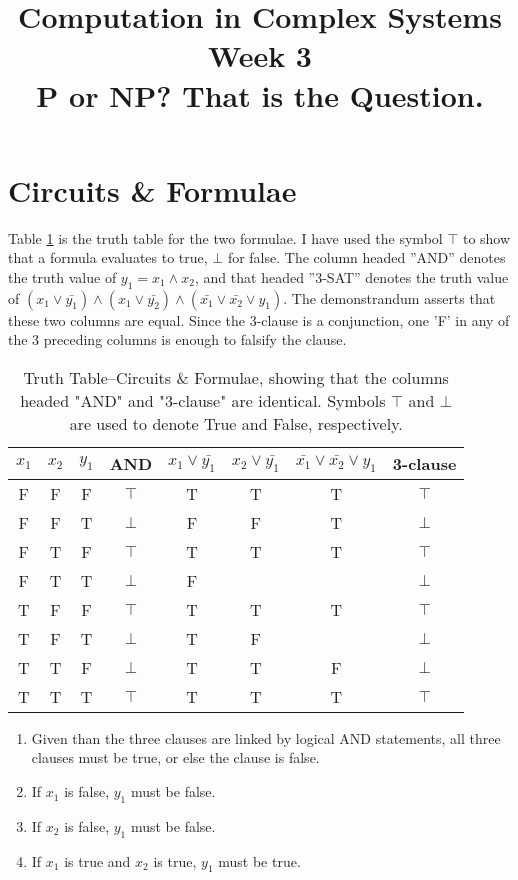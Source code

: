 \documentclass[]{article}
\title{Computation in Complex Systems\\
	Week 3\\
	P or NP? That is the Question.
	}
\begin{document}
\maketitle

\section{Circuits \& Formulae}

Table \ref{table:truth} is the truth table for the two formulae. I have used the symbol $\top$ to show that a formula evaluates to true, $\bot$ for false. The column headed ''AND'' denotes the truth value of $y_1 = x_1 \land x_2$, and that headed ''3-SAT'' denotes the truth value of $ (x_1\lor \bar{y_1}) \land (x_1\lor \bar{y_2}) \land (\bar{x_1} \lor \bar{x_2} \lor y_1)$. The demonstrandum asserts that these two columns are equal. Since the 3-clause is a conjunction, one 'F' in any of the 3 preceding columns is enough to falsify the clause.

\begin{table}[H]
	\caption{Truth Table--Circuits \& Formulae, showing that the columns headed "AND" and "3-clause" are identical. Symbols $\top$ and $\bot$ are used to denote True and False, respectively.}\label{table:truth}
	\begin{center}
		\begin{tabular}{|c|c|c||c|c|c|c||c|}\hline
			$x_1$&$x_2$&$y_1$&AND&$x_1 \lor \bar{y_1}$&$x_2 \lor \bar{y_1}$&$\bar{x_1}\lor\bar{x_2}\lor y_1$&3-clause\\ \hline
			F&F&F&$\top$&T&T&T&$\top$\\ \hline
			F&F&T&$\bot$&F&F&T&$\bot$\\ \hline
			F&T&F&$\top$&T&T&T&$\top$\\ \hline
			F&T&T&$\bot$&F&&&$\bot$\\ \hline
			T&F&F&$\top$&T&T&T&$\top$\\ \hline
			T&F&T&$\bot$&T&F&&$\bot$\\ \hline
			T&T&F&$\bot$&T&T&F&$\bot$\\ \hline
			T&T&T&$\top$&T&T&T&$\top$\\ \hline
		\end{tabular}
	\end{center}
\end{table}

\begin{enumerate}
	\item Given than the three clauses are linked by logical AND statements, all three clauses must be true, or else the clause is false.
	
	\item If $x_1$ is false, $y_1$ must be false.
	
	\item If $x_2$ is false, $y_1$ must be false.
	
	\item If $x_1$ is true and $x_2$ is true, $y_1$ must be true.
\end{enumerate}
\end{document}
